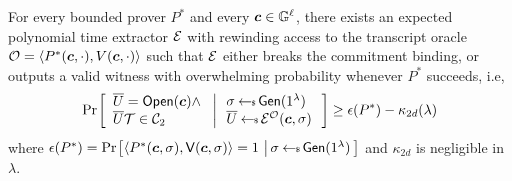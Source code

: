  
\begin{lemma}[Soundness]\label{lem:proximity2d_sound}
For every bounded prover $P^\ast$ and every $\bm{c}\in \mathbb{G}^\ell$, there exists an
expected polynomial time extractor $\mathcal{E}$ with
rewinding access to the transcript oracle $\mathcal{O}=\langle P^\ast(\bm{c},\cdot),V(\bm{c},\cdot)\rangle$
such that $\mathcal{E}$ either breaks the commitment binding, or outputs a valid
witness with overwhelming probability whenever $P^\ast$ succeeds, i.e,
{\small
\begin{align*}
\condprob{
\begin{array}{l}
\overline{U} = \open(\bm{c}) \wedge \\
\overline{U}\mc{T}\in \mc{C}_2
\end{array}
}{
\begin{array}{l}
\sigma\sample \gen(\secparam) \\
\overline{U}\sample \extr^{\mc{O}}(\bm{c},\sigma)
\end{array}}
\geq \epsilon(P^\ast) - \kappa_{2d}(\lambda)
\end{align*}
}
where $\epsilon(P^\ast)=\condprob{\langle
P^\ast(\bm{c},\sigma),\verifier(\bm{c},\sigma)\rangle = 1}{\sigma\sample
\gen(\secparam)}$ and $\kappa_{2d}$ is negligible in $\lambda$.
\end{lemma}

